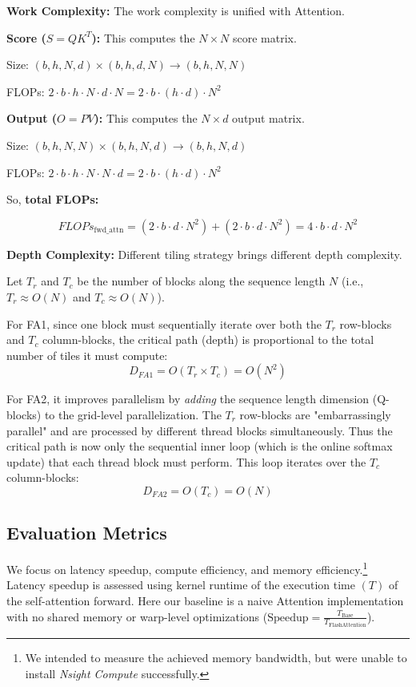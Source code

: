 \documentclass[11pt]{article}
\begin{document}
\textbf{Work Complexity: } The work complexity is unified with Attention. 


\textbf{Score ($S = QK^T$):} This computes the $N \times N$ score matrix.

Size: $(b, h, N, d) \times (b, h, d, N) \rightarrow (b, h, N, N)$

FLOPs: $2 \cdot b \cdot h \cdot N \cdot d \cdot N = 2 \cdot b \cdot (h \cdot d) \cdot N^2$

\textbf{Output ($O = PV$):} This computes the $N \times d$ output matrix.

Size: $(b, h, N, N) \times (b, h, N, d) \rightarrow (b, h, N, d)$

FLOPs: $2 \cdot b \cdot h \cdot N \cdot N \cdot d = 2 \cdot b \cdot (h \cdot d) \cdot N^2$


So, \textbf{total FLOPs:}

$$ FLOPs_{\text{fwd\_attn}} = (2 \cdot b \cdot d \cdot N^2) + (2 \cdot b \cdot d \cdot N^2) = 4 \cdot b \cdot d \cdot N^2 $$


\textbf{Depth Complexity: }
Different tiling strategy brings different depth complexity.

Let $T_r$ and $T_c$ be the number of blocks along the sequence length $N$ (i.e., $T_r \approx O(N)$ and $T_c \approx O(N)$).


For FA1, since one block must sequentially iterate over both the $T_r$ row-blocks and $T_c$ column-blocks, the critical path (depth) is proportional to the total number of tiles it must compute:
              \[ D_{FA1} = O(T_r \times T_c) = O(N^2) \]

For FA2, it improves parallelism by \textit{adding} the sequence length dimension (Q-blocks) to the grid-level parallelization. The $T_r$ row-blocks are "embarrassingly parallel" and are processed by different thread blocks simultaneously. Thus the critical path is now only the sequential inner loop (which is the online softmax update) that each thread block must perform. This loop iterates over the $T_c$ column-blocks:
              \[ D_{FA2} = O(T_c) = O(N) \]



\subsection{Evaluation Metrics}
We focus on latency speedup, compute efficiency, and memory efficiency.\footnote{We intended to measure the achieved memory bandwidth, but were unable to install \textit{Nsight Compute} successfully.} Latency speedup is assessed using kernel runtime of the execution time $(T)$ of the self-attention forward. Here our baseline is a naive Attention implementation with no shared memory or warp-level optimizations ($\text{Speedup} = \frac{T_{\text{Base}}}{T_{\text{FlashAttention}}}$).
\end{document}
